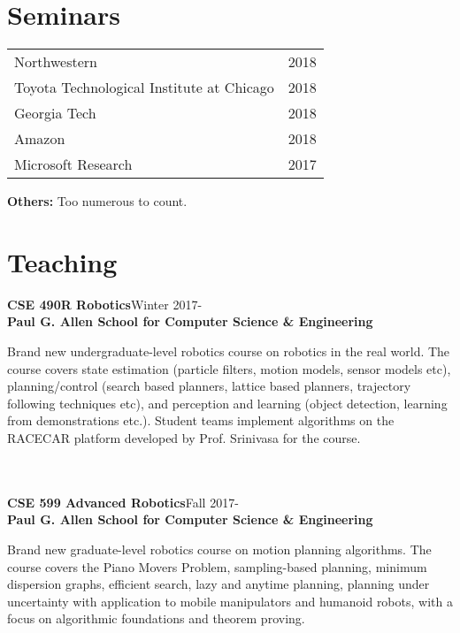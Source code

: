 \documentclass[10pt]{article}
\begin{document}
\section{Seminars}
\begin{center}
\begin{tabularx}{\linewidth}{Xr}
Northwestern & 2018\\
Toyota Technological Institute at Chicago & 2018\\
Georgia Tech & 2018\\
Amazon & 2018\\
Microsoft Research & 2017\\
\end{tabularx}
\end{center}
\noindent \textbf{Others:} Too numerous to count.

\section{Teaching}
\noindent
\textbf{CSE 490R Robotics}\hfill Winter 2017-\\
\textbf{Paul G. Allen School for Computer Science \& Engineering}\\
\parbox[t]{0.75\textwidth}{
Brand new undergraduate-level robotics course on robotics in the real world. The course covers state estimation (particle filters, motion models, sensor models etc), planning/control (search based planners, lattice based planners, trajectory following techniques etc), and perception and learning (object detection, learning from demonstrations etc.). Student teams implement algorithms on the RACECAR platform developed by Prof. Srinivasa for the course.
}\\
\\
\noindent
\textbf{CSE 599 Advanced Robotics}\hfill Fall 2017-\\
\textbf{Paul G. Allen School for Computer Science \& Engineering}\\
\parbox[t]{0.75\textwidth}{
Brand new graduate-level robotics course on motion planning algorithms. The course covers the Piano Movers Problem, sampling-based planning, minimum dispersion graphs, efficient search, lazy and anytime planning, planning under uncertainty with application to mobile manipulators and humanoid robots, with a focus on algorithmic foundations and theorem proving.
}
\end{document}
